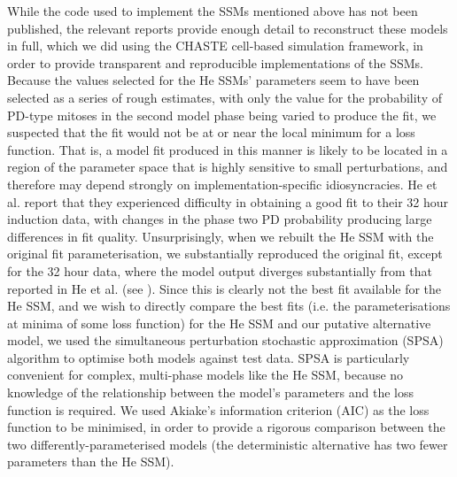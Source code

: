 While the code used to implement the SSMs mentioned above has not been published, the relevant reports provide enough detail to reconstruct these models in full, which we did using the CHASTE cell-based simulation framework, in order to provide transparent and reproducible implementations of the SSMs. Because the values selected for the He SSMs' parameters seem to have been selected as a series of rough estimates, with only the value for the probability of PD-type mitoses in the second model phase being varied to produce the fit, we suspected that the fit would not be at or near the local minimum for a loss function. That is, a model fit produced in this manner is likely to be located in a region of the parameter space that is highly sensitive to small perturbations, and therefore may depend strongly on implementation-specific idiosyncracies. He et al. report that they experienced difficulty in obtaining a good fit to their 32 hour induction data, with changes in the phase two PD probability producing large differences in fit quality. Unsurprisingly, when we rebuilt the He SSM with the original fit parameterisation, we substantially reproduced the original fit, except for the 32 hour data, where the model output diverges substantially from that reported in He et al. (see ). Since this is clearly not the best fit available for the He SSM, and we wish to directly compare the best fits (i.e. the parameterisations at minima of some loss function) for the He SSM and our putative alternative model, we used the simultaneous perturbation stochastic approximation (SPSA) algorithm \cite{Spall1998} to optimise both models against test data. SPSA is particularly convenient for complex, multi-phase models like the He SSM, because no knowledge of the relationship between the model's parameters and the loss function is required. We used Akiake's information criterion (AIC) as the loss function to be minimised, in order to provide a rigorous comparison between the two differently-parameterised models (the deterministic alternative has two fewer parameters than the He SSM). 

